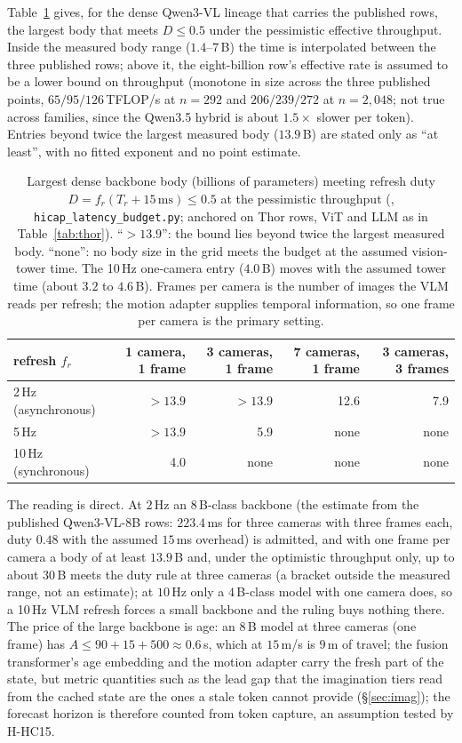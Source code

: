 Table~\ref{tab:maxbody} gives, for the dense Qwen3-VL lineage that carries the published rows, the largest body that meets $D\le0.5$ under the pessimistic effective throughput. Inside the measured body range ($1.4$--$7$\,B) the time is interpolated between the three published rows; above it, the eight-billion row's effective rate is assumed to be a lower bound on throughput (monotone in size across the three published points, $65/95/126$\,TFLOP/s at $n=292$ and $206/239/272$ at $n=2{,}048$; not true across families, since the Qwen3.5 hybrid is about $1.5\times$ slower per token). Entries beyond twice the largest measured body ($13.9$\,B) are stated only as ``at least'', with no fitted exponent and no point estimate.
\begin{table}[h]
\centering\small
\caption{Largest dense backbone body (billions of parameters) meeting refresh duty $D=f_r(T_r+15\,\text{ms})\le0.5$ at the pessimistic throughput (\evE, \texttt{hicap\_latency\_budget.py}; anchored on \evP{} Thor rows, ViT and LLM as in Table~\ref{tab:thor}). ``$>13.9$'': the bound lies beyond twice the largest measured body. ``none'': no body size in the grid meets the budget at the assumed vision-tower time. The 10\,Hz one-camera entry ($4.0$\,B) moves with the assumed tower time (about $3.2$ to $4.6$\,B). Frames per camera is the number of images the VLM reads per refresh; the motion adapter supplies temporal information, so one frame per camera is the primary setting.}
\label{tab:maxbody}
\begin{tabular}{@{}lrrrr@{}}
\toprule
refresh $f_r$ & 1 camera, 1 frame & 3 cameras, 1 frame & 7 cameras, 1 frame & 3 cameras, 3 frames \\ \midrule
2\,Hz (asynchronous) & $>13.9$ & $>13.9$ & 12.6 & 7.9 \\
5\,Hz & $>13.9$ & 5.9 & none & none \\
10\,Hz (synchronous) & 4.0 & none & none & none \\
\bottomrule
\end{tabular}
\end{table}
The reading is direct. At $2$\,Hz an 8\,B-class backbone (the estimate from the published Qwen3-VL-8B rows: $223.4$\,ms for three cameras with three frames each, duty $0.48$ with the assumed $15$\,ms overhead) is admitted, and with one frame per camera a body of at least $13.9$\,B and, under the optimistic throughput only, up to about $30$\,B meets the duty rule at three cameras (a bracket outside the measured range, not an estimate); at $10$\,Hz only a $4$\,B-class model with one camera does, so a 10\,Hz VLM refresh forces a small backbone and the ruling buys nothing there. The price of the large backbone is age: an 8\,B model at three cameras (one frame) has $A\le90+15+500\approx0.6$\,s, which at $15$\,m/s is $9$\,m of travel; the fusion transformer's age embedding and the motion adapter carry the fresh part of the state, but metric quantities such as the lead gap that the imagination tiers read from the cached state are the ones a stale token cannot provide (\S\ref{sec:imag}); the forecast horizon is therefore counted from token capture, an assumption tested by H-HC15.

